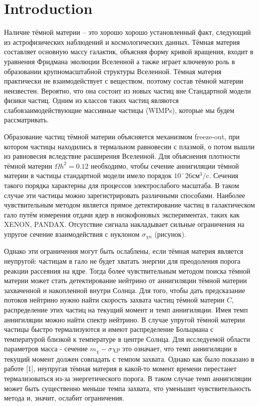 \documentclass[a4paper, 14pt]{article}
\begin{document}
	
	\tableofcontents
	\section{Introduction}
	Наличие тёмной материи – это хорошо хорошо установленный факт, следующий из астрофизических наблюдений и космологических данных. Тёмная материя составляет основную массу галактик, объясняя форму кривой вращения, входит в уравнения Фридмана эволюции Вселенной а также играет ключевую роль в образовании крупномасштабной структуры Вселенной. 	Тёмная материя практически не взаимодействует с веществом, поэтому состав тёмной материи неизвестен. Вероятно, что она состоит из новых частиц вне Стандартной модели физики частиц. Одним из классов таких частиц являются слабовзаимодействующие массивные частицы (WIMPs), которые мы будем рассматривать.


Образование частиц тёмной материи объясняется механизмом freeze-out, при котором частицы находились в термальном равновесии с  плазмой, о потом вышли из равновесия вследствие расширения Вселенной. Для объяснения плотности тёмной материи $\Omega h^2 = 0.12$ необходимо, чтобы сечение аннигиляции тёмной материи в частицы стандартной модели имело порядок $10^-26 \text{см}^3/\text{c}$. Сечения такого порядка характерны для процессов электрослабого масштаба. В таком случае эти частицы можно зарегистрировать различными способами. Наиболее чувствительным методом является прямое детектирование частиц в галактическом гало путём измерения отдачи ядер в низкофоновых экспериментах, таких как XENON, PANDAX. Отсутствие сигнала накладывает сильные ограничения на упругое сечение взаимодействия с нуклоном $\sigma_{\chi n}$ (рисунок).


Однако эти ограничения могут быть ослаблены, если тёмная материя является неупругой: частицам в гало не будет хватать энергии для преодоления порога реакции рассеяния на ядре. Тогда более чувствительным методом поиска тёмной материи может стать детектирование нейтрино от аннигиляции тёмной материи захваченной и накопленной внутри Солнца. Для того, чтобы дать предсказание потоков нейтрино нужно найти скорость захвата частиц тёмной материи $C$, распределение этих частиц на текущий момент и темп аннигиляции. Имея темп аннигиляции можно найти спектр нейтрино. В случае упругой тёмной материи частицы быстро термализуются и имеют распределение Больцмана с температурой близкой к температуре в центре Солнца. Для исследуемой области параметров масса - сечение $m_{\chi} - \sigma{\chi p}$ это означает, что темп аннигиляции в текущий момент должен совпадать с темпом захвата. Однако как было показано в работе [1], неупругая тёмная материя в какой-то момент времени перестанет термализоваться из-за энергетического порога. В таком случае темп аннигиляции может быть существенно меньше темпа захвата, что уменьшит чувствительность метода и, значит, ослабит ограничения.
\end{document}
